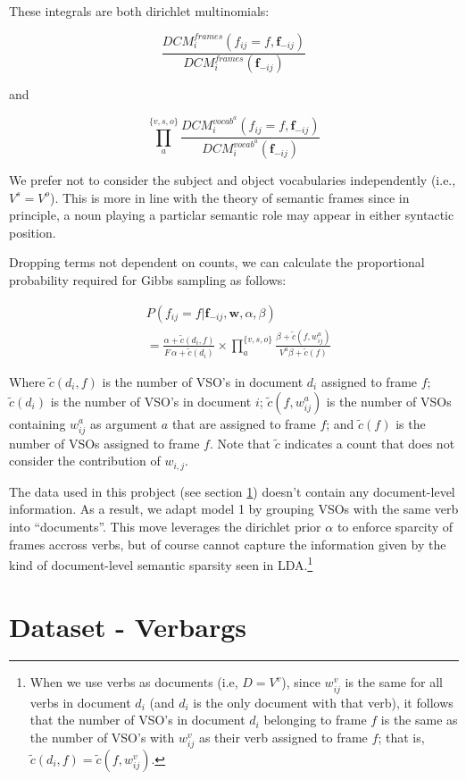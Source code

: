 \documentclass[11pt,twocolumn,DIV=11]{scrartcl}
\begin{document}
These integrals are both dirichlet multinomials:

\[
\frac{DCM_i^{frames}(f_{ij}=f, \mathbf{f}_{-ij})}{DCM_i^{frames}(\mathbf{f}_{-ij})}
\]

and

\[
\prod_a^{\{v,s,o\}}\frac{DCM_i^{vocab^a}(f_{ij}=f, \mathbf{f}_{-ij})}{DCM_i^{vocab^a}(\mathbf{f}_{-ij})}
\]

We prefer not to consider the subject and object vocabularies independently 
(i.e., $V^s = V^o$). This is more in line with the theory of semantic frames 
since in principle, a noun playing a particlar semantic role may appear in either 
syntactic position.

Dropping terms not dependent on counts, we can calculate the proportional
probability required for Gibbs sampling as follows:

\begin{align}
& P(f_{ij} = f|\mathbf{f}_{-ij},\mathbf{w}, \alpha,\beta)\nonumber\\
&=\frac{\alpha + \tilde c(d_i,f)}{F\,\alpha + \tilde c(d_i)}
\times \prod_a^{\{v,s,o\}}\frac{\beta+\tilde c(f,w_{ij}^a)}{V^a\beta+\tilde c(f)}
\end{align}

Where $\tilde c (d_i, f)$ is the number of VSO's in document $d_i$ assigned to frame $f$;
$\tilde c(d_i)$ is the number of VSO's in document $i$;
$\tilde c(f,w_{ij}^a)$ is the number of VSOs containing $w_{ij}^a$ as argument $a$ that are
assigned to frame $f$; and
$\tilde c(f)$ is the number of VSOs assigned to frame $f$.
Note that $\tilde c$ indicates a count that does not consider the contribution of 
$w_{i,j}$.

The data used in this probject (see section \ref{data}) doesn't contain any document-level
information. As a result, we adapt model 1 by grouping VSOs with the same verb into ``documents''.
This move leverages the dirichlet prior $\alpha$ to enforce sparcity of frames 
accross verbs, but of course cannot capture the information given by the kind of
document-level semantic sparsity seen in LDA.\footnote{When we use verbs as
documents (i.e, $D = V^v$), since $w_{ij}^v$ is the same for all verbs in document $d_i$ 
(and $d_i$ is the only document with that verb), it follows that the number of VSO's in document 
$d_i$ belonging to frame $f$ is the same as the number of VSO's with $w_{ij}^v$ as their verb assigned to 
frame $f$; that is, $\tilde c(d_i, f) = \tilde c(f, w_{ij}^v)$.}

\section{Dataset - Verbargs}
\label{data}
\end{document}
